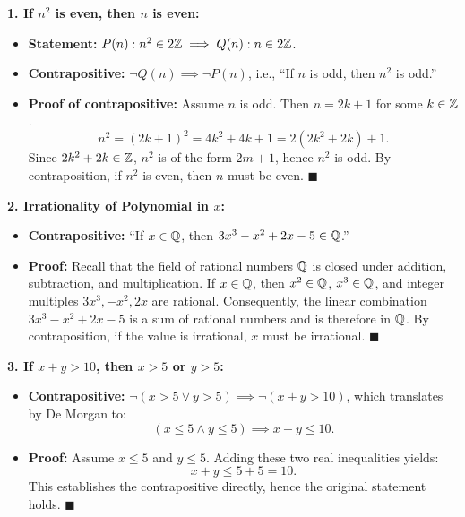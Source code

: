 \begin{solution}
\textbf{1. If $n^2$ is even, then $n$ is even:}
\begin{itemize}[leftmargin=1.5em,itemsep=2pt]
  \item \textbf{Statement:} $P(n): n^2 \in 2\mathbb{Z} \implies Q(n): n \in 2\mathbb{Z}$.
  \item \textbf{Contrapositive:} $\neg Q(n) \implies \neg P(n)$, i.e., ``If $n$ is odd, then $n^2$ is odd.''
  \item \textbf{Proof of contrapositive:} Assume $n$ is odd. Then $n = 2k + 1$ for some $k \in \mathbb{Z}$.
  \[
  n^2 = (2k + 1)^2 = 4k^2 + 4k + 1 = 2(2k^2 + 2k) + 1.
  \]
  Since $2k^2 + 2k \in \mathbb{Z}$, $n^2$ is of the form $2m + 1$, hence $n^2$ is odd.
  By contraposition, if $n^2$ is even, then $n$ must be even. \hfill $\blacksquare$
\end{itemize}

\textbf{2. Irrationality of Polynomial in $x$:}
\begin{itemize}[leftmargin=1.5em,itemsep=2pt]
  \item \textbf{Contrapositive:} ``If $x \in \mathbb{Q}$, then $3x^3 - x^2 + 2x - 5 \in \mathbb{Q}$.''
  \item \textbf{Proof:} Recall that the field of rational numbers $\mathbb{Q}$ is closed under addition, subtraction, and multiplication.
  If $x \in \mathbb{Q}$, then $x^2 \in \mathbb{Q}$, $x^3 \in \mathbb{Q}$, and integer multiples $3x^3, -x^2, 2x$ are rational.
  Consequently, the linear combination $3x^3 - x^2 + 2x - 5$ is a sum of rational numbers and is therefore in $\mathbb{Q}$.
  By contraposition, if the value is irrational, $x$ must be irrational. \hfill $\blacksquare$
\end{itemize}

\textbf{3. If $x + y > 10$, then $x > 5$ or $y > 5$:}
\begin{itemize}[leftmargin=1.5em,itemsep=2pt]
  \item \textbf{Contrapositive:} $\neg(x > 5 \lor y > 5) \implies \neg(x + y > 10)$, which translates by De Morgan to:
  \[
  (x \le 5 \land y \le 5) \implies x + y \le 10.
  \]
  \item \textbf{Proof:} Assume $x \le 5$ and $y \le 5$. Adding these two real inequalities yields:
  \[
  x + y \le 5 + 5 = 10.
  \]
  This establishes the contrapositive directly, hence the original statement holds. \hfill $\blacksquare$
\end{itemize}
\end{solution}

